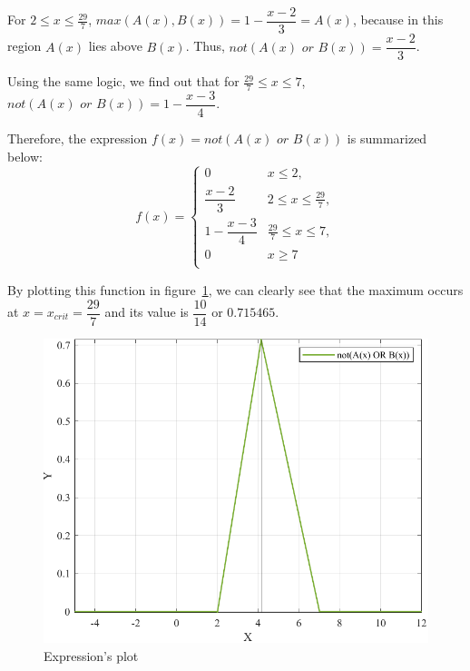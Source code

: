 For $2 \le x \le \frac{29}{7}$, $\textit{max}\left(A(x), B(x)\right) = 1 - \dfrac{x-2}{3} = A(x)$, because in this region $A(x)$ lies above $B(x)$. Thus, $\textit{not}\left(A(x) \textit{ or } B(x)\right) = \dfrac{x-2}{3}$.

Using the same logic, we find out that for $\frac{29}{7} \le x \le 7$, $\textit{not}\left(A(x) \textit{ or } B(x)\right) = 1 - \dfrac{x-3}{4}$. 

Therefore, the expression $f(x) = \textit{not}\left(A(x) \textit{ or } B(x)\right)$ is summarized below:
\begin{equation}
	f(x) = \left\{
	\begin{array}{cc}
		0 & x \le 2, \\[4mm]
		\dfrac{x-2}{3} & 2 \le x \le \frac{29}{7}, \\[4mm]
		1 - \dfrac{x-3}{4} & \frac{29}{7} \le x \le 7, \\[4mm]
		0 & x \ge 7\\
	\end{array}
	\right.
\end{equation}

By plotting this function in figure~\ref{fig:prob_12_expression_plot}, we can clearly see that the maximum occurs at $x = x_{crit} = \dfrac{29}{7}$ and its value is $\dfrac{10}{14}$ or $0.715465$.

\begin{figure}[htp]
	\centering
	\includegraphics[width=.45\textwidth]{../Problem 12/expression_plot.pdf}
	\caption{Expression's plot}
	\label{fig:prob_12_expression_plot}
\end{figure}
